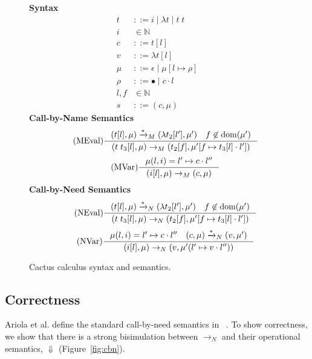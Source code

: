 \begin{figure*}
\textbf{Syntax}
\begin{align*}
\tag{Term} t &::= i \; | \; \lambda t \; | \; t \; t  \\
\tag{Variable} i &\in \mathbb{N}  \\
\tag{Closure} c &::= t [l] \\
\tag{Value} v &::= \lambda t [l] \\
\tag{Heap} \mu &::= \epsilon \; | \; \mu [ l \mapsto \rho ] \\
\tag{Environment} \rho &::= \bullet \; | \; c \cdot l \\
\tag{Location} l,f &\in \mathbb{N}  \\
\tag{State} s &::= (c, \mu)
\end{align*}
\textbf{Call-by-Name Semantics}
\begin{align*}
\tag{MEval} \inference
{(t[l], \mu) \xrightarrow{* }_{M} (\lambda t_2[l'], \mu') \quad f \not \in \textnormal{dom}(\mu')}
{(t \; t_3[l], \mu) \rightarrow_{M} (t_2[f], \mu'[f \mapsto t_3[l] \cdot l'])}  
\end{align*}
\begin{align*}
\tag{MVar} \inference 
{\mu(l, i) = l' \mapsto c \cdot l''}
{(i[l],\mu) \rightarrow_M (c,\mu)}
\end{align*}
\textbf{Call-by-Need Semantics}
\begin{align*}
\tag{NEval} \inference
{(t[l], \mu) \xrightarrow{* }_{N} (\lambda t_2[l'], \mu') \quad f \not \in \textnormal{dom}(\mu')}
{(t \; t_3[l], \mu) \rightarrow_{N} (t_2[f], \mu'[f \mapsto t_3[l] \cdot l'])}  
\end{align*}
\begin{align*}
\tag{NVar} \inference
{\mu(l, i) = l' \mapsto c \cdot l'' \quad (c, \mu) \xrightarrow{* }_{N} (v, \mu')}
{(i[l],\mu) \rightarrow_N (v, \mu'(l' \mapsto v \cdot l''))}
\end{align*}
\caption{Cactus calculus syntax and semantics.}
\label{fig:calccact}
\end{figure*}

\subsection{Correctness}

Ariola et al. define the standard call-by-need semantics in
~\cite{ariola1995call}. To show correctness, we show that there is a strong
bisimulation between $\rightarrow_{N}$ and their operational
semantics, $\Downarrow$ (Figure~\ref{fig:cbn}).  

